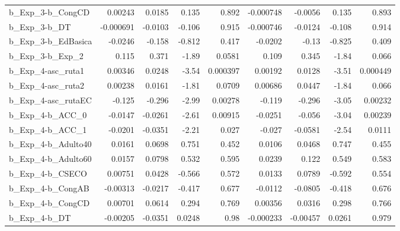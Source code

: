 \begin{tabular}{lrrrrrrrr}
b\_Exp\_3-b\_CongCD           &     0.00243 &       0.0185 &    0.135 &    0.892 &  -0.000748 &     -0.0056 &        0.135 &         0.893 \\
b\_Exp\_3-b\_DT               &   -0.000691 &      -0.0103 &   -0.106 &    0.915 &  -0.000746 &     -0.0124 &       -0.108 &         0.914 \\
b\_Exp\_3-b\_EdBasica         &     -0.0246 &       -0.158 &   -0.812 &    0.417 &    -0.0202 &       -0.13 &       -0.825 &         0.409 \\
b\_Exp\_3-b\_Exp\_2            &       0.115 &        0.371 &    -1.89 &   0.0581 &      0.109 &       0.345 &        -1.84 &         0.066 \\
b\_Exp\_4-asc\_ruta1          &     0.00346 &       0.0248 &    -3.54 & 0.000397 &    0.00192 &      0.0128 &        -3.51 &      0.000449 \\
b\_Exp\_4-asc\_ruta2          &     0.00238 &       0.0161 &    -1.81 &   0.0709 &    0.00686 &      0.0447 &        -1.84 &         0.066 \\
b\_Exp\_4-asc\_rutaEC         &      -0.125 &       -0.296 &    -2.99 &  0.00278 &     -0.119 &      -0.296 &        -3.05 &       0.00232 \\
b\_Exp\_4-b\_ACC\_0            &     -0.0147 &      -0.0261 &    -2.61 &  0.00915 &    -0.0251 &      -0.056 &        -3.04 &       0.00239 \\
b\_Exp\_4-b\_ACC\_1            &     -0.0201 &      -0.0351 &    -2.21 &    0.027 &     -0.027 &     -0.0581 &        -2.54 &        0.0111 \\
b\_Exp\_4-b\_Adulto40         &      0.0161 &       0.0698 &    0.751 &    0.452 &     0.0106 &      0.0468 &        0.747 &         0.455 \\
b\_Exp\_4-b\_Adulto60         &      0.0157 &       0.0798 &    0.532 &    0.595 &     0.0239 &       0.122 &        0.549 &         0.583 \\
b\_Exp\_4-b\_CSECO            &     0.00751 &       0.0428 &   -0.566 &    0.572 &     0.0133 &      0.0789 &       -0.592 &         0.554 \\
b\_Exp\_4-b\_CongAB           &    -0.00313 &      -0.0217 &   -0.417 &    0.677 &    -0.0112 &     -0.0805 &       -0.418 &         0.676 \\
b\_Exp\_4-b\_CongCD           &     0.00701 &       0.0614 &    0.294 &    0.769 &    0.00356 &      0.0316 &        0.298 &         0.766 \\
b\_Exp\_4-b\_DT               &    -0.00205 &      -0.0351 &   0.0248 &     0.98 &  -0.000233 &    -0.00457 &       0.0261 &         0.979 \\

\end{tabular}
